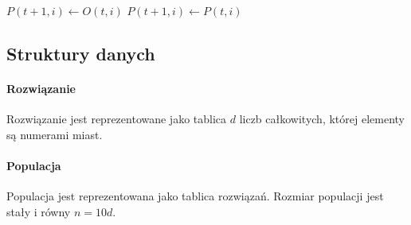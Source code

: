 \documentclass[12pt, a4paper]{article}
\begin{document}
\begin{algorithm}[!htb]
\begin{algorithmic}[1]
      \State $P(t+1, i) \gets O(t, i)$
    \Else
      \State $P(t+1, i) \gets P(t, i)$
    \EndIf
  \EndFor
\EndFunction
\end{algorithmic}
\end{algorithm}

\subsection{Struktury danych}
	\paragraph{Rozwiązanie}
		Rozwiązanie jest reprezentowane jako tablica $d$ liczb całkowitych, której elementy są numerami miast.
	\paragraph{Populacja}
		Populacja jest reprezentowana jako tablica rozwiązań. Rozmiar populacji jest stały i równy $n = 10d$.
\end{document}
